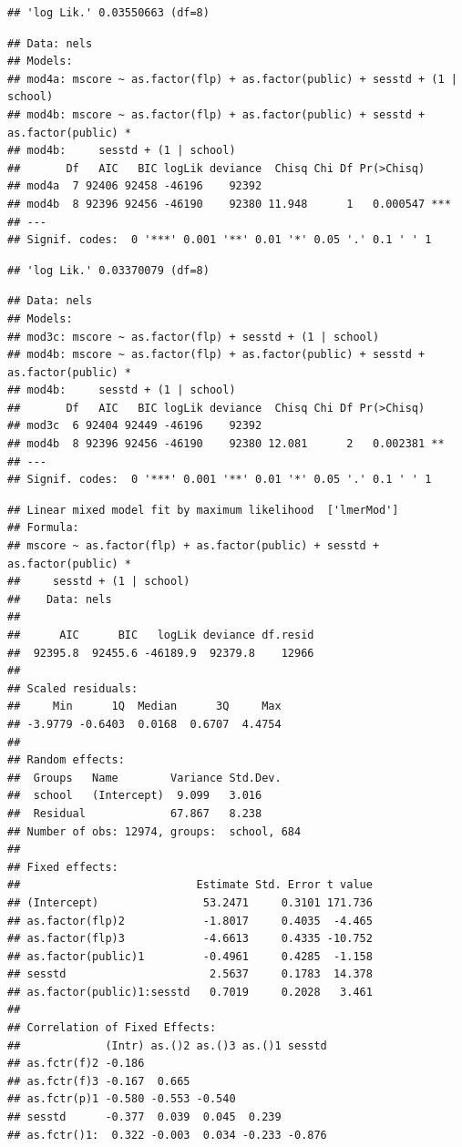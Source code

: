 \documentclass[ignorenonframetext,]{beamer}
\begin{document}
\begin{frame}[fragile]{}

\begin{verbatim}
## 'log Lik.' 0.03550663 (df=8)
\end{verbatim}

\begin{verbatim}
## Data: nels
## Models:
## mod4a: mscore ~ as.factor(flp) + as.factor(public) + sesstd + (1 | school)
## mod4b: mscore ~ as.factor(flp) + as.factor(public) + sesstd + as.factor(public) * 
## mod4b:     sesstd + (1 | school)
##       Df   AIC   BIC logLik deviance  Chisq Chi Df Pr(>Chisq)    
## mod4a  7 92406 92458 -46196    92392                             
## mod4b  8 92396 92456 -46190    92380 11.948      1   0.000547 ***
## ---
## Signif. codes:  0 '***' 0.001 '**' 0.01 '*' 0.05 '.' 0.1 ' ' 1
\end{verbatim}

\begin{verbatim}
## 'log Lik.' 0.03370079 (df=8)
\end{verbatim}

\begin{verbatim}
## Data: nels
## Models:
## mod3c: mscore ~ as.factor(flp) + sesstd + (1 | school)
## mod4b: mscore ~ as.factor(flp) + as.factor(public) + sesstd + as.factor(public) * 
## mod4b:     sesstd + (1 | school)
##       Df   AIC   BIC logLik deviance  Chisq Chi Df Pr(>Chisq)   
## mod3c  6 92404 92449 -46196    92392                            
## mod4b  8 92396 92456 -46190    92380 12.081      2   0.002381 **
## ---
## Signif. codes:  0 '***' 0.001 '**' 0.01 '*' 0.05 '.' 0.1 ' ' 1
\end{verbatim}

\begin{verbatim}
## Linear mixed model fit by maximum likelihood  ['lmerMod']
## Formula: 
## mscore ~ as.factor(flp) + as.factor(public) + sesstd + as.factor(public) *  
##     sesstd + (1 | school)
##    Data: nels
## 
##      AIC      BIC   logLik deviance df.resid 
##  92395.8  92455.6 -46189.9  92379.8    12966 
## 
## Scaled residuals: 
##     Min      1Q  Median      3Q     Max 
## -3.9779 -0.6403  0.0168  0.6707  4.4754 
## 
## Random effects:
##  Groups   Name        Variance Std.Dev.
##  school   (Intercept)  9.099   3.016   
##  Residual             67.867   8.238   
## Number of obs: 12974, groups:  school, 684
## 
## Fixed effects:
##                           Estimate Std. Error t value
## (Intercept)                53.2471     0.3101 171.736
## as.factor(flp)2            -1.8017     0.4035  -4.465
## as.factor(flp)3            -4.6613     0.4335 -10.752
## as.factor(public)1         -0.4961     0.4285  -1.158
## sesstd                      2.5637     0.1783  14.378
## as.factor(public)1:sesstd   0.7019     0.2028   3.461
## 
## Correlation of Fixed Effects:
##             (Intr) as.()2 as.()3 as.()1 sesstd
## as.fctr(f)2 -0.186                            
## as.fctr(f)3 -0.167  0.665                     
## as.fctr(p)1 -0.580 -0.553 -0.540              
## sesstd      -0.377  0.039  0.045  0.239       
## as.fctr()1:  0.322 -0.003  0.034 -0.233 -0.876
\end{verbatim}


\end{frame}
\end{document}
